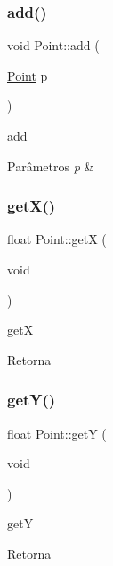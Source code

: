 \subsubsection{\texorpdfstring{add()}{add()}}
{\footnotesize\ttfamily void Point\+::add (\begin{DoxyParamCaption}\item[{\mbox{\hyperlink{class_point}{Point}}}]{p }\end{DoxyParamCaption})}



add 


\begin{DoxyParams}{Parâmetros}
{\em p} & \\
\hline
\end{DoxyParams}
\mbox{\label{class_point_a9aa94b8fd07296e64d304ef3750db113}} 
\subsubsection{\texorpdfstring{get\+X()}{getX()}}
{\footnotesize\ttfamily float Point\+::getX (\begin{DoxyParamCaption}\item[{void}]{ }\end{DoxyParamCaption})}



getX 

\begin{DoxyReturn}{Retorna}

\end{DoxyReturn}
\mbox{\label{class_point_a2444daa96871c89614510bc4bfcd19ce}} 
\subsubsection{\texorpdfstring{get\+Y()}{getY()}}
{\footnotesize\ttfamily float Point\+::getY (\begin{DoxyParamCaption}\item[{void}]{ }\end{DoxyParamCaption})}



getY 

\begin{DoxyReturn}{Retorna}

\end{DoxyReturn}
\mbox{\label{class_point_aa3005a9d97e2cb05624414973a214788}} 
